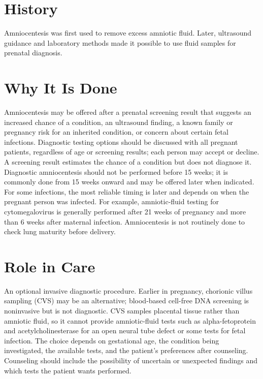 \section*{History}
Amniocentesis was first used to remove excess amniotic fluid. Later, ultrasound guidance and laboratory methods made it possible to use fluid samples for prenatal diagnosis.

\section*{Why It Is Done}
Amniocentesis may be offered after a prenatal screening result that suggests an increased chance of a condition, an ultrasound finding, a known family or pregnancy risk for an inherited condition, or concern about certain fetal infections. Diagnostic testing options should be discussed with all pregnant patients, regardless of age or screening results; each person may accept or decline. A screening result estimates the chance of a condition but does not diagnose it. Diagnostic amniocentesis should not be performed before 15 weeks; it is commonly done from 15 weeks onward and may be offered later when indicated. For some infections, the most reliable timing is later and depends on when the pregnant person was infected. For example, amniotic-fluid testing for cytomegalovirus is generally performed after 21 weeks of pregnancy and more than 6 weeks after maternal infection. Amniocentesis is not routinely done to check lung maturity before delivery.

\section*{Role in Care}
An optional invasive diagnostic procedure. Earlier in pregnancy, chorionic villus sampling (CVS) may be an alternative; blood-based cell-free DNA screening is noninvasive but is not diagnostic. CVS samples placental tissue rather than amniotic fluid, so it cannot provide amniotic-fluid tests such as alpha-fetoprotein and acetylcholinesterase for an open neural tube defect or some tests for fetal infection. The choice depends on gestational age, the condition being investigated, the available tests, and the patient's preferences after counseling. Counseling should include the possibility of uncertain or unexpected findings and which tests the patient wants performed.

